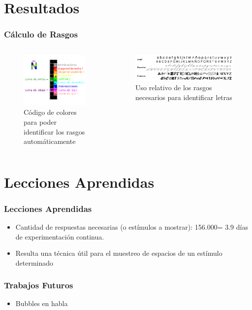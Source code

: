 \documentclass{beamer}
\begin{document}
  \section{Resultados}

	\begin{frame}
	\frametitle{Cálculo de Rasgos}
	\begin{columns} [t]
	\begin{figure}
	\includegraphics[width=.8\textwidth]{graficos/REFERENCIA.png}
	\caption{Código de colores para poder identificar los rasgos automáticamente}
	\end{figure}
	\begin{figure}
	\includegraphics[width=.5\textwidth]{graficos/letras.png}
	\caption{Uso relativo de los rasgos necesarios para identificar letras}
	\end{figure}
	\end{columns}
	\end{frame}



\section{Lecciones Aprendidas}
	\begin{frame}
	\frametitle{Lecciones Aprendidas}
	\begin{itemize}
	\item Cantidad de respuestas necesarias (o estímulos a mostrar): 156.000= 3.9 días de experimentación continua.
	\item Resulta una técnica útil para el muestreo de espacios de un estímulo determinado
	\end{itemize}
	\end{frame}

	\begin{frame}
	\frametitle{Trabajos Futuros}
	\begin{itemize}
	\item Bubbles en habla
	\end{itemize}
	\end{frame}


\author[Cossio Mercado,G\'omez Mayol,Mart\'inez Soler]{Mail\'en G\'omez Mayol,\\Miguel Mart\'inez Soler,\\Christian Cossio Mercado}
\begin{frame}
 \titlepage
\end{frame}
\end{document}
